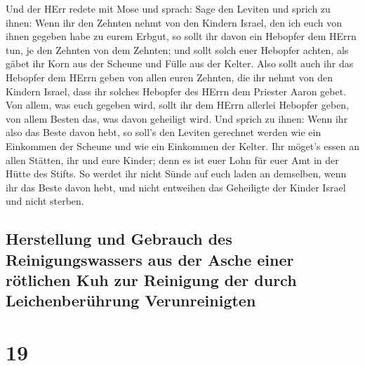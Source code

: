  Und der HErr redete mit Mose und sprach: 
Sage den Leviten und sprich zu ihnen: Wenn ihr den Zehnten nehmt von den
Kindern Israel, den ich euch von ihnen gegeben habe zu eurem Erbgut, so
sollt ihr davon ein Hebopfer dem HErrn tun, je den Zehnten von dem
Zehnten;  und sollt solch euer Hebopfer achten, als gäbet
ihr Korn aus der Scheune und Fülle aus der Kelter.  Also
sollt auch ihr das Hebopfer dem HErrn geben von allen euren Zehnten, die
ihr nehmt von den Kindern Israel, dass ihr solches Hebopfer des HErrn
dem Priester Aaron gebet.  Von allem, was euch gegeben
wird, sollt ihr dem HErrn allerlei Hebopfer geben, von allem Besten das,
was davon geheiligt wird.  Und sprich zu ihnen: Wenn ihr
also das Beste davon hebt, so soll's den Leviten gerechnet werden wie
ein Einkommen der Scheune und wie ein Einkommen der Kelter.
 Ihr möget's essen an allen Stätten, ihr und eure Kinder;
denn es ist euer Lohn für euer Amt in der Hütte des Stifts.
 So werdet ihr nicht Sünde auf euch laden an demselben,
wenn ihr das Beste davon hebt, und nicht entweihen das Geheiligte der
Kinder Israel und nicht sterben.

\hypertarget{herstellung-und-gebrauch-des-reinigungswassers-aus-der-asche-einer-ruxf6tlichen-kuh-zur-reinigung-der-durch-leichenberuxfchrung-verunreinigten}{%
\subsection{Herstellung und Gebrauch des Reinigungswassers aus der Asche
einer rötlichen Kuh zur Reinigung der durch Leichenberührung
Verunreinigten}\label{herstellung-und-gebrauch-des-reinigungswassers-aus-der-asche-einer-ruxf6tlichen-kuh-zur-reinigung-der-durch-leichenberuxfchrung-verunreinigten}}

\hypertarget{section-18}{%
\section{19}\label{section-18}}

